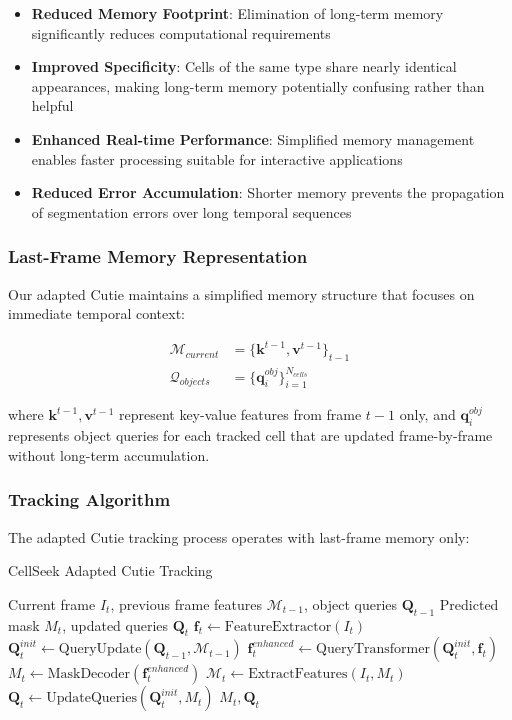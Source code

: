 \documentclass[12pt]{article}
\begin{document}
\begin{itemize}
  \item \textbf{Reduced Memory Footprint}: Elimination of long-term memory significantly reduces computational requirements
  \item \textbf{Improved Specificity}: Cells of the same type share nearly identical appearances, making long-term memory potentially confusing rather than helpful
  \item \textbf{Enhanced Real-time Performance}: Simplified memory management enables faster processing suitable for interactive applications
  \item \textbf{Reduced Error Accumulation}: Shorter memory prevents the propagation of segmentation errors over long temporal sequences
\end{itemize}

\subsubsection{Last-Frame Memory Representation}

Our adapted Cutie maintains a simplified memory structure that focuses on immediate temporal context:

\begin{align}
  \mathcal{M}_{current} & = \{\mathbf{k}^{t-1}, \mathbf{v}^{t-1}\}_{t-1} \\
  \mathcal{Q}_{objects} & = \{\mathbf{q}_i^{obj}\}_{i=1}^{N_{cells}}
\end{align}

where $\mathbf{k}^{t-1}, \mathbf{v}^{t-1}$ represent key-value features from frame $t-1$ only, and $\mathbf{q}_i^{obj}$ represents object queries for each tracked cell that are updated frame-by-frame without long-term accumulation.

\subsubsection{Tracking Algorithm}

The adapted Cutie tracking process operates with last-frame memory only:

\begin{algorithm}[H]
  \caption{CellSeek Adapted Cutie Tracking}
  \begin{algorithmic}[1]
    \REQUIRE Current frame $I_t$, previous frame features $\mathcal{M}_{t-1}$, object queries $\mathbf{Q}_{t-1}$
    \ENSURE Predicted mask $M_t$, updated queries $\mathbf{Q}_t$
    \STATE $\mathbf{f}_t \leftarrow \text{FeatureExtractor}(I_t)$
    \STATE $\mathbf{Q}_t^{init} \leftarrow \text{QueryUpdate}(\mathbf{Q}_{t-1}, \mathcal{M}_{t-1})$
    \STATE $\mathbf{f}_t^{enhanced} \leftarrow \text{QueryTransformer}(\mathbf{Q}_t^{init}, \mathbf{f}_t)$
    \STATE $M_t \leftarrow \text{MaskDecoder}(\mathbf{f}_t^{enhanced})$
    \STATE $\mathcal{M}_t \leftarrow \text{ExtractFeatures}(I_t, M_t)$ 
    \STATE $\mathbf{Q}_t \leftarrow \text{UpdateQueries}(\mathbf{Q}_t^{init}, M_t)$
    \RETURN $M_t, \mathbf{Q}_t$
  \end{algorithmic}
\end{algorithm}
\end{document}
